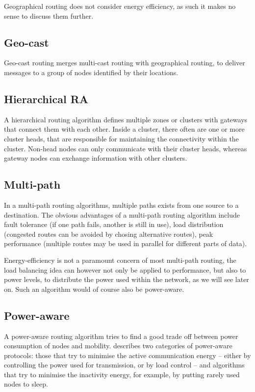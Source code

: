 \documentclass[conference]{IEEEtran}
\begin{document}
Geographical routing does not consider energy efficiency, as such it makes
no sense to discuss them further.

\subsection{Geo-cast}
Geo-cast routing merges multi-cast routing with geographical routing, to
deliver messages to a group of nodes identified by their locations.

\subsection{Hierarchical RA}
A hierarchical routing algorithm defines multiple zones or clusters with
gateways that connect them with each other. Inside a cluster, there often
are one or more cluster heads, that are responsible for maintaining the
connectivity within the cluster. Non-head nodes can only communicate with
their cluster heads, whereas gateway nodes can exchange information with
other clusters.


\subsection{Multi-path}
In a multi-path routing algorithms, multiple paths exists from one source
to a destination. The obvious advantages of a multi-path routing
algorithm include fault tolerance (if one path fails, another is still in
use), load distribution (congested routes can be avoided by chosing alternative
routes), peak performance (multiple routes may be used in parallel for different
parts of data).

Energy-efficiency is not a paramount concern of most multi-path routing, the
load balancing idea can however not only be applied to performance, but also
to power levels, to distribute the power used within the network, as we will
see later on. Such an algorithm would of course also be power-aware.

\subsection{Power-aware}
A power-aware routing algorithm tries to find a good trade off between
power consumption of nodes and mobility. \cite{main1} describes two categories
of power-aware protocols: those that try to minimise the active communication energy -- either
by controlling the power used for transmission, or by load control -- and
algorithms that try to minimise the inactivity energy, for example, by putting
rarely used nodes to sleep.
\end{document}
